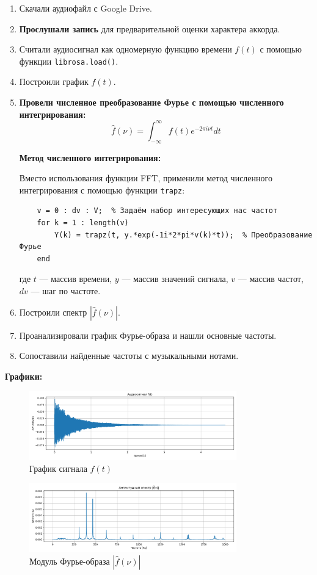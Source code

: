 \begin{enumerate}
    \item Скачали аудиофайл с Google Drive.
    \item \textbf{Прослушали запись} для предварительной оценки характера аккорда.
    \item Считали аудиосигнал как одномерную функцию времени $f(t)$ с помощью функции \texttt{librosa.load()}.
    \item Построили график $f(t)$.
    \item \textbf{Провели численное преобразование Фурье с помощью численного интегрирования:}
    \[
    \hat{f}(\nu) = \int_{-\infty}^{\infty} f(t) e^{-2\pi i \nu t} dt
    \]
    
    \textbf{Метод численного интегрирования:}
    
    Вместо использования функции FFT, применили метод численного интегрирования с помощью функции \texttt{trapz}:
    \begin{verbatim}
    v = 0 : dv : V;  % Задаём набор интересующих нас частот
    for k = 1 : length(v)
        Y(k) = trapz(t, y.*exp(-1i*2*pi*v(k)*t));  % Преобразование Фурье
    end
    \end{verbatim}
    
    где $t$ — массив времени, $y$ — массив значений сигнала, $v$ — массив частот, $dv$ — шаг по частоте.
    
    \item Построили спектр $|\hat{f}(\nu)|$.
    \item Проанализировали график Фурье-образа и нашли основные частоты.
    \item Сопоставили найденные частоты с музыкальными нотами.
\end{enumerate}

\textbf{Графики:}

\begin{figure}[H]
    \centering
    \includegraphics[width=0.8\textwidth]{audio_signal.png}
    \caption{График сигнала $f(t)$}
\end{figure}

\begin{figure}[H]
    \centering
    \includegraphics[width=0.8\textwidth]{audio_spectrum.png}
    \caption{Модуль Фурье-образа $|\hat{f}(\nu)|$}
\end{figure}

